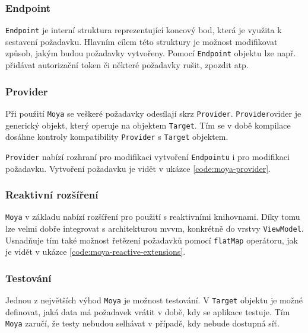
\subsubsection*{Endpoint}

\texttt{Endpoint} je interní struktura reprezentující koncový bod, která je využita k sestavení požadavku.
Hlavním cílem této struktury je možnost modifikovat způsob, jakým budou požadavky vytvořeny.
Pomocí \texttt{Endpoint} objektu lze např. přidávat autorizační token či některé požadavky rušit, zpozdit atp.

\subsubsection*{Provider}

Při použití \texttt{Moya} se veškeré požadavky odesílají skrz \texttt{Provider}.
\texttt{Provider}ovider je generický objekt, který operuje na objektem \texttt{Target}.
Tím se v době kompilace dosáhne kontroly kompatibility \texttt{Provider} s \texttt{Target} objektem.

\texttt{Provider} nabízí rozhraní pro modifikaci vytvoření \texttt{Endpointu} i pro modifikaci požadavku.
Vytvoření požadavku je vidět v ukázce \ref{code:moya-provider}.


\subsubsection*{Reaktivní rozšíření}

\texttt{Moya} v základu nabízí rozšíření pro použití s reaktivními knihovnami.
Díky tomu lze velmi dobře integrovat s architekturou \acrshort{mvvm}, konkrétně do vrstvy \texttt{ViewModel}.
Usnadňuje tím také možnost řetězení požadavků pomocí \texttt{flatMap} operátoru, jak je vidět v ukázce \ref{code:moya-reactive-extensions}.


\subsubsection*{Testování}

Jednou z největších výhod \texttt{Moya} je možnost testování.
V \texttt{Target} objektu je možné definovat, jaká data má požadavek vrátit v době, kdy se aplikace testuje.
Tím \texttt{Moya} zaručí, že testy nebudou selhávat v případě, kdy nebude dostupná síť.


